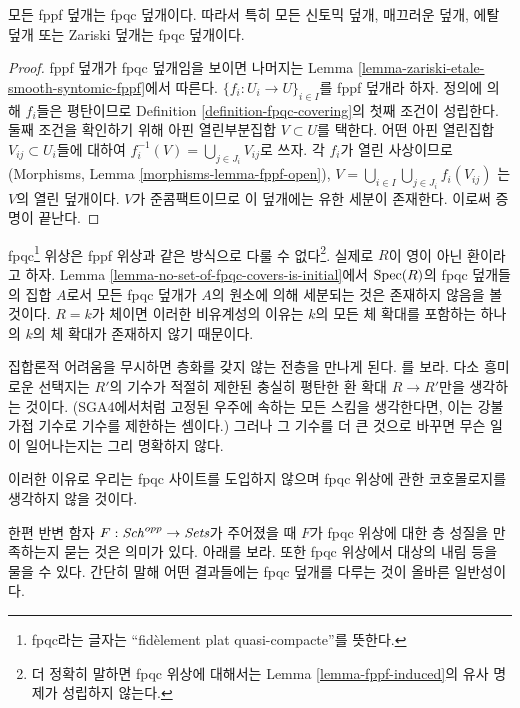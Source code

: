 \begin{lemma}
\label{lemma-zariski-etale-smooth-syntomic-fppf-fpqc}
모든 fppf 덮개는 fpqc 덮개이다. 따라서 특히 모든 신토믹 덮개, 매끄러운
덮개, \'에탈 덮개 또는 Zariski 덮개는 fpqc 덮개이다.
\end{lemma}

\begin{proof}
fppf 덮개가 fpqc 덮개임을 보이면 나머지는 Lemma
\ref{lemma-zariski-etale-smooth-syntomic-fppf}에서 따른다.
$\{f_i : U_i \to U\}_{i \in I}$를 fppf 덮개라 하자. 정의에 의해
$f_i$들은 평탄이므로 Definition \ref{definition-fpqc-covering}의 첫째 조건이
성립한다. 둘째 조건을 확인하기 위해 아핀 열린부분집합 $V \subset U$를
택한다. 어떤 아핀 열린집합 $V_{ij} \subset U_i$들에 대하여
$f_i^{-1}(V) = \bigcup_{j \in J_i} V_{ij}$로 쓰자. 각 $f_i$가 열린 사상이므로
(Morphisms, Lemma \ref{morphisms-lemma-fppf-open}),
$V = \bigcup_{i\in I} \bigcup_{j \in J_i} f_i(V_{ij})$
는 $V$의 열린 덮개이다. $V$가 준콤팩트이므로 이 덮개에는 유한 세분이
존재한다. 이로써 증명이 끝난다.
\end{proof}

\noindent
fpqc\footnote{fpqc라는 글자는 ``fid\`element plat quasi-compacte''를
뜻한다.} 위상은 fppf 위상과 같은 방식으로 다룰 수 없다\footnote{더 정확히
말하면 fpqc 위상에 대해서는 Lemma \ref{lemma-fppf-induced}의 유사 명제가
성립하지 않는다.}. 실제로 $R$이 영이 아닌 환이라고 하자. Lemma
\ref{lemma-no-set-of-fpqc-covers-is-initial}에서 $\mathop{\mathrm{Spec}}(R)$의 fpqc 덮개들의
집합 $A$로서 모든 fpqc 덮개가 $A$의 원소에 의해 세분되는 것은 존재하지
않음을 볼 것이다. $R = k$가 체이면 이러한 비유계성의 이유는 $k$의 모든 체 확대를
포함하는 하나의 $k$의 체 확대가 존재하지 않기 때문이다.

\medskip\noindent
집합론적 어려움을 무시하면 층화를 갖지 않는 전층을 만나게 된다.
\cite[Theorem 5.5]{Waterhouse-fpqc-sheafification}를 보라. 다소 흥미로운
선택지는 $R'$의 기수가 적절히 제한된 충실히 평탄한 환 확대
$R \to R'$만을 생각하는 것이다. (SGA4에서처럼 고정된 우주에 속하는 모든
스킴을 생각한다면, 이는 강불가접 기수로 기수를 제한하는 셈이다.) 그러나
그 기수를 더 큰 것으로 바꾸면 무슨 일이 일어나는지는 그리 명확하지 않다.

\medskip\noindent
이러한 이유로 우리는 fpqc 사이트를 도입하지 않으며 fpqc 위상에 관한
코호몰로지를 생각하지 않을 것이다.

\medskip\noindent
한편 반변 함자 $F : \mathit{Sch}^{opp} \to \textit{Sets}$가 주어졌을 때 $F$가
fpqc 위상에 대한 층 성질을 만족하는지 묻는 것은 의미가 있다. 아래를 보라.
또한 fpqc 위상에서 대상의 내림 등을 물을 수 있다. 간단히 말해 어떤
결과들에는 fpqc 덮개를 다루는 것이 올바른 일반성이다.

